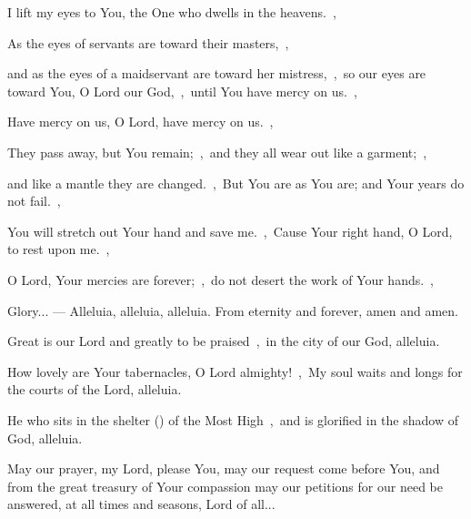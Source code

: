 \documentclass[12pt,twoside,a5paper]{article}
\begin{document}

\begin{halfparskip}
  I lift my eyes to You, the One who dwells in the heavens.~\sep

  As the eyes of servants are toward their masters,~\sep

  and as the eyes of a maidservant are toward her mistress,~\sep\ so our eyes are toward You, O Lord our God,~\sep\ until You have mercy on us.~\sep

  Have mercy on us, O Lord, have mercy on us.~\sep
\end{halfparskip}

\begin{halfparskip}
   They pass away, but You remain;~\sep\ and they all wear out like a garment;~\sep

  and like a mantle they are changed.~\sep\ But You are as You are; and Your years do not fail.~\sep
\end{halfparskip}

\begin{halfparskip}
   You will stretch out Your hand and save me.~\sep\ Cause Your right hand, O Lord, to rest upon me.~\sep

  O Lord, Your mercies are forever;~\sep\ do not desert the work of Your hands.~\sep
\end{halfparskip}

Glory... --- Alleluia, alleluia, alleluia. From eternity and forever, amen and amen.


 Great is our Lord and greatly to be praised~\sep\ in the city of our God, alleluia.

 How lovely are Your tabernacles, O Lord almighty!~\sep\ My soul waits and longs for the courts of the Lord, alleluia.

 He who sits in the shelter () of the Most High~\sep\ and is glorified in the shadow of God, alleluia.


May our prayer, my Lord, please You, may our request come before You, and from the great treasury of Your compassion may our petitions for our need be answered, at all times and seasons, Lord of all...
\end{document}
